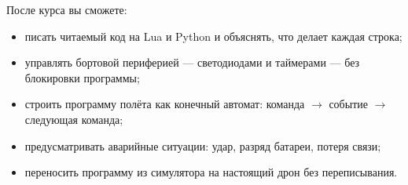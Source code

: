 После курса вы сможете:
\begin{itemize}
    \item писать читаемый код на Lua и Python и объяснять, что делает каждая строка;
    \item управлять бортовой периферией --- светодиодами и таймерами --- без блокировки программы;
    \item строить программу полёта как конечный автомат: команда $\to$ событие $\to$ следующая команда;
    \item предусматривать аварийные ситуации: удар, разряд батареи, потеря связи;
    \item переносить программу из симулятора на настоящий дрон без переписывания.
\end{itemize}
